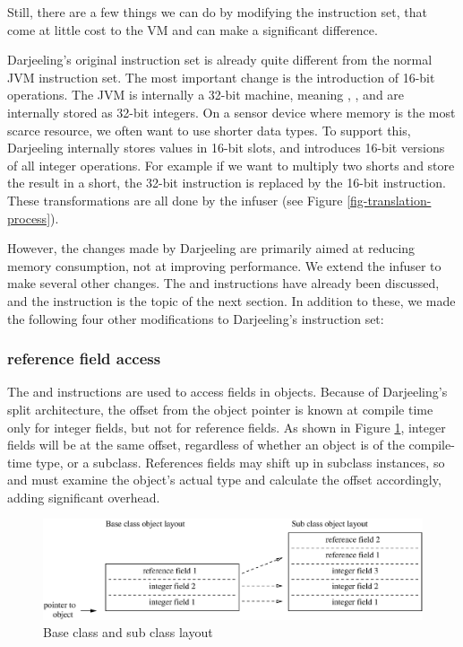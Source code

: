 Still, there are a few things we can do by modifying the instruction set, that come at little cost to the VM and can make a significant difference.

Darjeeling's original instruction set is already quite different from the normal JVM instruction set. The most important change is the introduction of 16-bit operations. The JVM is internally a 32-bit machine, meaning , , and  are internally stored as 32-bit integers. On a sensor device where memory is the most scarce resource, we often want to use shorter data types. To support this, Darjeeling internally stores values in 16-bit slots, and introduces 16-bit versions of all integer operations. For example if we want to multiply two shorts and store the result in a short, the 32-bit  instruction is replaced by the 16-bit  instruction. These transformations are all done by the infuser (see Figure \ref{fig-translation-process}).

However, the changes made by Darjeeling are primarily aimed at reducing memory consumption, not at improving performance. We extend the infuser to make several other changes. The  and  instructions have already been discussed, and the  instruction is the topic of the next section. In addition to these, we made the following four other modifications to Darjeeling's instruction set:

\subsubsection{ reference field access}
The  and  instructions are used to access fields in objects. Because of Darjeeling's split architecture, the offset from the object pointer is known at compile time only for integer fields, but not for reference fields. As shown in Figure \ref{fig-super-class-sub-class-field-layout}, integer fields will be at the same offset, regardless of whether an object is of the compile-time type, or a subclass. References fields may shift up in subclass instances, so  and  must examine the object's actual type and calculate the offset accordingly, adding significant overhead.

\begin{figure}[]
  \includegraphics[width=0.6\linewidth]{super-class-sub-class-field-layout.eps}
  \caption{Base class and sub class layout }
  \label{fig-super-class-sub-class-field-layout}
\end{figure}

